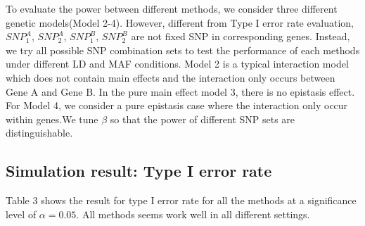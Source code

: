 \documentclass{article}
\begin{document}
        To evaluate the power between different methods, we consider three different genetic models(Model 2-4). However, different from Type I error rate evaluation, $SNP^A_1$, $SNP^A_2$, $SNP^B_1$, $SNP^B_2$ are not fixed SNP in corresponding genes. Instead, we try all possible SNP combination sets to test the performance of each methods under different LD and MAF conditions. Model 2 is a typical interaction model which does not contain main effects and the interaction only occurs between Gene A and Gene B. In the pure main effect model 3, there is no epistasis effect. For Model 4, we consider a pure epistasis case where the interaction only occur within genes.We tune $\beta$ so that the power of different SNP sets are distinguishable.

        \subsection{Simulation result: Type I error rate}
        Table 3 shows the result for type I error rate for all the methods at a significance level of $\alpha=0.05$. All methods seems work well in all different settings.
\end{document}
